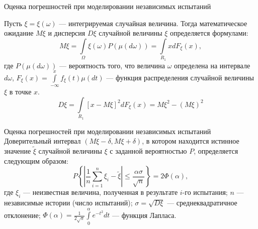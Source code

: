 \documentclass{beamer}
\begin{document}
	\begin{frame} {Оценка погрешностей при моделировании независимых испытаний}

		
		Пусть $\xi=\xi(\omega)$ --- интегрируемая случайная величина. Тогда математическое ожидание $M\xi$ и дисперсия $D\xi$ случайной величины $\xi$ определяется формулами:
		\[
			M\xi = \int\limits_{\varOmega} \xi (\omega) P(\mu (d \omega) )
			= \int \limits_{R_1} x  d F_{\xi}(x) 
			,
		\]
		где $P(\mu( d \omega))$ %
		--- вероятность того, что величина $\omega$ определена на интервале $d\omega$, 
		$F_{\xi} (x)=\int \limits_{-\infty}^{x} f_{\xi} (t) \mu (dt)$ --- функция распределения случайной величины $\xi$ в точке $x$.
		\[
			D\xi = \int \limits_{R_1} {[x - M \xi]}^2 d F_{\xi}(x) 
			= M \xi^2 - {(M \xi)}^2
		\]

				
		\note{
		}
	\end{frame}

	\begin{frame} {Оценка погрешностей при моделировании независимых испытаний}
		Доверительный интервал $(M\xi - \delta, M\xi + \delta)$, в котором находится истинное значение $\tilde {\xi}$ случайной величины $\xi$ %
		с заданной вероятностью $P$, определяется следующим образом:
		\[
			P \left\{ \left| \frac{1}{n} \sum^n_{i=1} \xi_i - \tilde{\xi} \right| 
			\leqslant  \frac{\alpha \sigma}{\sqrt{n}} \right\} 
			= 2 \varPhi(\alpha) 
			,
		\]
		где 
		$\xi_i$ --- неизвестная величина, полученная в результате $i$-го испытания; 
		$n$ --- независимые истории (число испытаний); 
		$\sigma = \sqrt{D \xi}$ --- среднеквадратичное отклонение; %
		$\varPhi (\alpha)= \frac{1}{2 \sqrt{\pi}}  \int \limits_{0}^{\alpha}  e^{-t^2} dt $ --- функция Лапласа.

	
	\end{frame}
	
\end{document}
